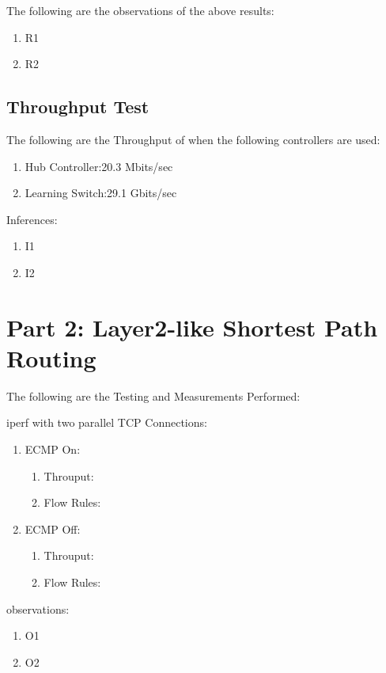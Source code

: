 \documentclass[12pt]{article}
\begin{document}
The following are the observations of the above results:

\begin{enumerate}
    \item R1
    \item R2
\end{enumerate}


\subsection{Throughput Test}

The following are the Throughput of when the following controllers are used:
\begin{enumerate}
    \item Hub Controller:20.3 Mbits/sec
    \item Learning Switch:29.1 Gbits/sec
\end{enumerate}

Inferences:
\begin{enumerate}
    \item I1
    \item I2
\end{enumerate}


\section{Part 2: Layer2-like Shortest Path Routing}

The following are the Testing and Measurements Performed:

iperf with two parallel TCP Connections:
\begin{enumerate}
    \item ECMP On:
    \begin{enumerate}
        \item Throuput:
        \item Flow Rules:
    \end{enumerate}
    \item ECMP Off:
    \begin{enumerate}
        \item Throuput:
        \item Flow Rules:
    \end{enumerate}
\end{enumerate}

observations:
\begin{enumerate}
    \item O1
    \item O2
\end{enumerate}
\end{document}
